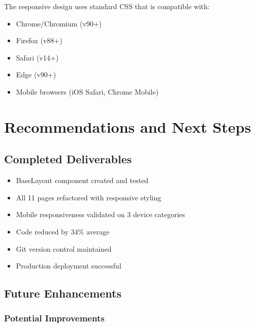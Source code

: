 \documentclass[11pt, a4paper]{report}
\begin{document}
The responsive design uses standard CSS that is compatible with:

\begin{itemize}
    \item Chrome/Chromium (v90+)
    \item Firefox (v88+)
    \item Safari (v14+)
    \item Edge (v90+)
    \item Mobile browsers (iOS Safari, Chrome Mobile)
\end{itemize}

\chapter{Recommendations and Next Steps}

\section{Completed Deliverables}

\begin{itemize}
    \item[\textcolor{darkgreen}{\checkmark}] BaseLayout component created and tested
    \item[\textcolor{darkgreen}{\checkmark}] All 11 pages refactored with responsive styling
    \item[\textcolor{darkgreen}{\checkmark}] Mobile responsiveness validated on 3 device categories
    \item[\textcolor{darkgreen}{\checkmark}] Code reduced by 34\% average
    \item[\textcolor{darkgreen}{\checkmark}] Git version control maintained
    \item[\textcolor{darkgreen}{\checkmark}] Production deployment successful
\end{itemize}

\section{Future Enhancements}

\subsection{Potential Improvements}
\end{document}
